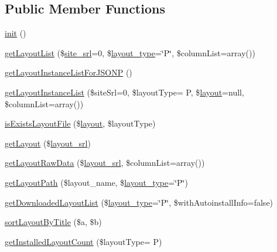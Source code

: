 \subsection*{Public Member Functions}
\begin{DoxyCompactItemize}
\item 
\hyperlink{classlayoutModel_a0e38b226e6c6f4ceae728725e40178fd}{init} ()
\item 
\hyperlink{classlayoutModel_afc353a7801c6cd15af3822e6fdac9ba2}{get\+Layout\+List} (\$\hyperlink{ko_8install_8php_a8b1406b4ad1048041558dce6bfe89004}{site\+\_\+srl}=0, \$\hyperlink{ko_8install_8php_a0532d89570cfdaebc628afac2ff5a81b}{layout\+\_\+type}=\char`\"{}P\char`\"{}, \$column\+List=array())
\item 
\hyperlink{classlayoutModel_a8093366d9ab2988d5ae6d51856752f91}{get\+Layout\+Instance\+List\+For\+J\+S\+O\+N\+P} ()
\item 
\hyperlink{classlayoutModel_a4cd0c42496b7529d53835669eb4798c5}{get\+Layout\+Instance\+List} (\$site\+Srl=0, \$layout\+Type= \textquotesingle{}P\textquotesingle{}, \$\hyperlink{classlayout}{layout}=null, \$column\+List=array())
\item 
\hyperlink{classlayoutModel_aad01da0a48d593382de1d46df2c6d2c2}{is\+Exists\+Layout\+File} (\$\hyperlink{classlayout}{layout}, \$layout\+Type)
\item 
\hyperlink{classlayoutModel_a46f845328e6b65e772408ceb990adb6b}{get\+Layout} (\$\hyperlink{ko_8install_8php_a70054876db09b2519a1726663c8dd9e7}{layout\+\_\+srl})
\item 
\hyperlink{classlayoutModel_a008cf11689e020eb48ac719eb33979a6}{get\+Layout\+Raw\+Data} (\$\hyperlink{ko_8install_8php_a70054876db09b2519a1726663c8dd9e7}{layout\+\_\+srl}, \$column\+List=array())
\item 
\hyperlink{classlayoutModel_a623568fac8ced4bb39cf0d181e8dd4ff}{get\+Layout\+Path} (\$layout\+\_\+name, \$\hyperlink{ko_8install_8php_a0532d89570cfdaebc628afac2ff5a81b}{layout\+\_\+type}=\char`\"{}P\char`\"{})
\item 
\hyperlink{classlayoutModel_aed10488985735bd1adda014388b3a781}{get\+Downloaded\+Layout\+List} (\$\hyperlink{ko_8install_8php_a0532d89570cfdaebc628afac2ff5a81b}{layout\+\_\+type}=\char`\"{}P\char`\"{}, \$with\+Autoinstall\+Info=false)
\item 
\hyperlink{classlayoutModel_a2fe5cbdc4be434f56cc1fed03588d1f4}{sort\+Layout\+By\+Title} (\$a, \$b)
\item 
\hyperlink{classlayoutModel_a0d0b74697a88270380a7f7afac1af96b}{get\+Installed\+Layout\+Count} (\$layout\+Type= \textquotesingle{}P\textquotesingle{})

\end{DoxyCompactItemize}
